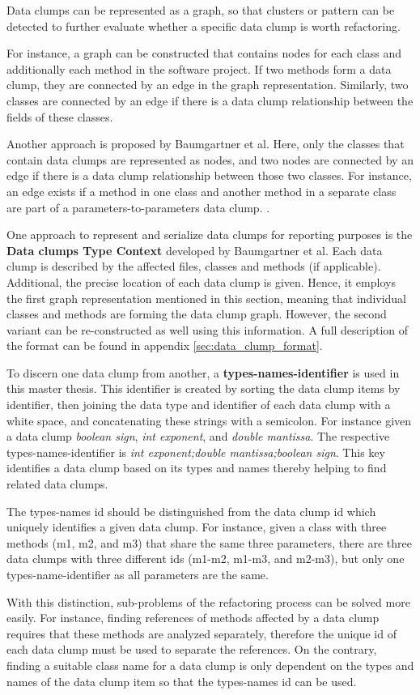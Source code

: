 Data clumps can be represented as a graph, so that clusters or pattern can be detected to further evaluate whether a specific data clump is worth refactoring. 

For instance, a graph can be constructed that contains nodes for each class and additionally each method in the software project. If two methods form a data clump, they are connected by an edge in the graph representation. Similarly, two classes  are connected by an edge if there is a data clump relationship between the fields of these classes. 

Another approach is proposed by Baumgartner et al. Here, only the classes that contain data clumps are represented as nodes, and two nodes are connected by an edge if there is a data clump relationship between those two classes. For instance, an edge exists if a method in one class and another method in a separate class are part of a parameters-to-parameters data clump. \cite{data_clumps_baumgartner}.


One approach to represent and serialize data clumps for reporting purposes is the \textbf{Data clumps Type Context} \cite{dataclump_type_context} developed by Baumgartner et al. Each data clump is described by the affected files, classes and methods (if applicable). Additional, the precise location of each data clump is given. Hence,  it employs the first graph representation mentioned in this section, meaning that individual classes and methods are forming the data clump graph. However, the second variant can be re-constructed as well using this information. 
A full description of the format can be found in appendix \ref{sec:data_clump_format}.

To discern one data clump from another, a \textbf{types-names-identifier} is used in this master thesis. This identifier is created by sorting the data clump items by identifier, then joining the data type and identifier of each data clump with a white space, and concatenating these strings with a semicolon. For instance given a data clump \textit{boolean sign}, \textit{int exponent}, and \textit{double mantissa}. The respective types-names-identifier is \textit{int exponent;double mantissa;boolean sign}. This key identifies a data clump based on its types and names thereby helping to find related data clumps. 

The types-names id should be distinguished from the data clump id which uniquely identifies a given data clump. For instance, given a class with three methods (m1, m2, and m3) that share the same three parameters, there are three data clumps with three different ids (m1-m2, m1-m3, and m2-m3), but only one types-name-identifier as all parameters are the same. 

With this distinction, sub-problems of the refactoring process can be solved more easily. For instance, finding references of methods affected by a data clump requires that these methods are analyzed separately, therefore the unique id of each data clump must be used to separate the references. On the contrary, finding a suitable class name for a data clump is only dependent on the types and names of the data clump item so that the types-names id can be used. 






